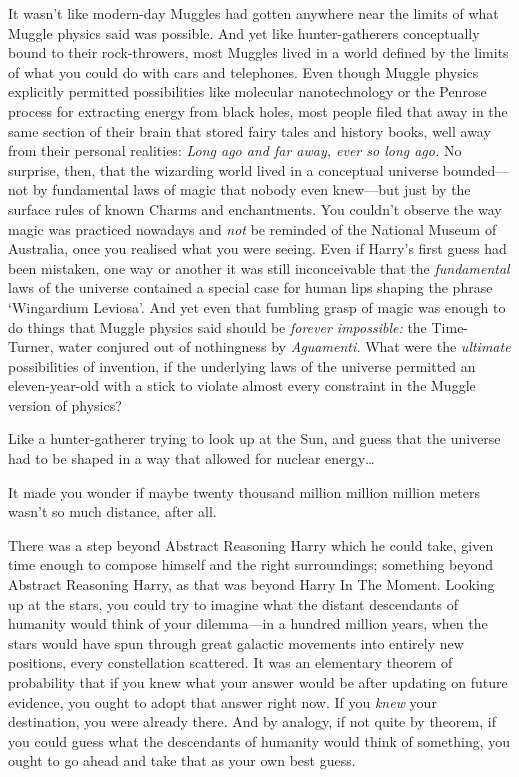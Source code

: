 It wasn't like modern-day Muggles had gotten anywhere near the limits of
what Muggle physics said was possible. And yet like hunter-gatherers
conceptually bound to their rock-throwers, most Muggles lived in a world
defined by the limits of what you could do with cars and telephones.
Even though Muggle physics explicitly permitted possibilities like
molecular nanotechnology or the Penrose process for extracting energy
from black holes, most people filed that away in the same section of
their brain that stored fairy tales and history books, well away from
their personal realities: \emph{Long ago and far away, ever so long
ago.} No surprise, then, that the wizarding world lived in a conceptual
universe bounded---not by fundamental laws of magic that nobody even
knew---but just by the surface rules of known Charms and enchantments.
You couldn't observe the way magic was practiced nowadays and \emph{not}
be reminded of the National Museum of Australia, once you realised what
you were seeing. Even if Harry's first guess had been mistaken, one way
or another it was still inconceivable that the \emph{fundamental} laws
of the universe contained a special case for human lips shaping the
phrase `Wingardium Leviosa'. And yet even that fumbling grasp of magic
was enough to do things that Muggle physics said should be \emph{forever
impossible:} the Time-Turner, water conjured out of nothingness by
\emph{Aguamenti.} What were the \emph{ultimate} possibilities of
invention, if the underlying laws of the universe permitted an
eleven-year-old with a stick to violate almost every constraint in the
Muggle version of physics?

Like a hunter-gatherer trying to look up at the Sun, and guess that the
universe had to be shaped in a way that allowed for nuclear
energy\ldots{}

It made you wonder if maybe twenty thousand million million million
meters wasn't so much distance, after all.

There was a step beyond Abstract Reasoning Harry which he could take,
given time enough to compose himself and the right surroundings;
something beyond Abstract Reasoning Harry, as that was beyond Harry In
The Moment. Looking up at the stars, you could try to imagine what the
distant descendants of humanity would think of your dilemma---in a
hundred million years, when the stars would have spun through great
galactic movements into entirely new positions, every constellation
scattered. It was an elementary theorem of probability that if you knew
what your answer would be after updating on future evidence, you ought
to adopt that answer right now. If you \emph{knew} your destination, you
were already there. And by analogy, if not quite by theorem, if you
could guess what the descendants of humanity would think of something,
you ought to go ahead and take that as your own best guess.

